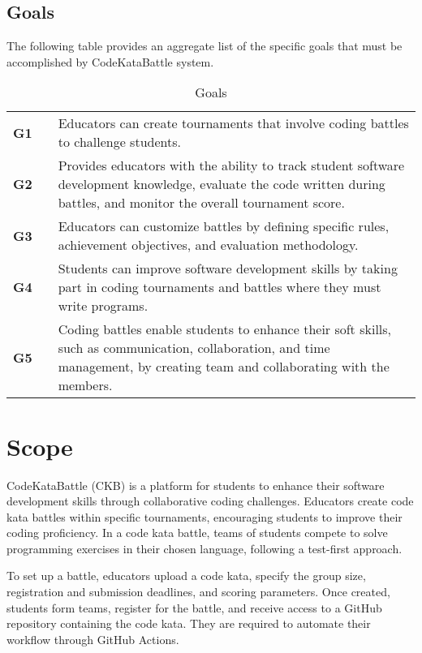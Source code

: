 \subsection{Goals}
The following table provides an aggregate list of the specific goals that must be accomplished by CodeKataBattle system.

\begin{table}[H]
    \centering
    \renewcommand{\arraystretch}{1.5} 
    \begin{tabular}{l l p{12.5cm}}
    \hline
        \textbf{G1} & & Educators can create tournaments that involve coding battles to challenge students. \\                                                                                                
        \textbf{G2} & & Provides educators with the ability to track student software development knowledge, evaluate the code written during battles, and monitor the overall tournament score. \\ 
        \textbf{G3} & & Educators can customize battles by defining specific rules, achievement objectives, and evaluation methodology. \\
        \textbf{G4} & & Students can improve software development skills by taking part in coding tournaments and battles where they must write programs. \\
        \textbf{G5} & & Coding battles enable students to enhance their soft skills, such as communication, collaboration, and time management, by creating team and collaborating with the members. \\
    \hline
    \end{tabular}
    \caption{Goals}
\end{table}

\section{Scope}

CodeKataBattle (CKB) is a platform for students to enhance their software development skills through collaborative coding challenges. 
Educators create code kata battles within specific tournaments, encouraging students to improve their coding proficiency. 
In a code kata battle, teams of students compete to solve programming exercises in their chosen language, following a test-first approach.

To set up a battle, educators upload a code kata, specify the group size, registration and submission deadlines, and scoring parameters. 
Once created, students form teams, register for the battle, and receive access to a GitHub repository containing the code kata. 
They are required to automate their workflow through GitHub Actions.

